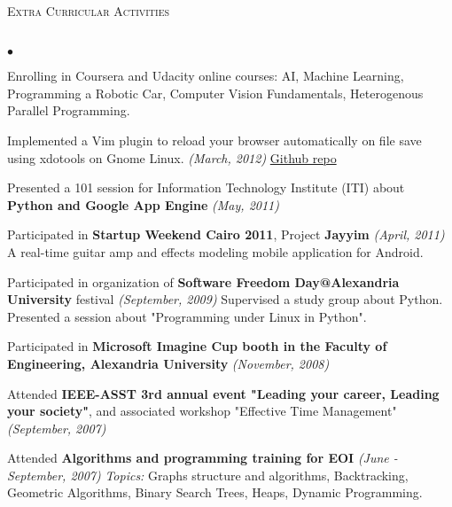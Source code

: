 \documentclass[letterpaper,12pt]{article}
\newcommand{\lineunder}{\vspace*{-8pt} \\ \hspace*{-8pt} \hrulefill \\}
\newcommand{\interval}[1]{\textit{(#1)} }
\newcommand{\header}[1]{{\hspace*{0pt}\vspace*{6pt} \textsc{#1}} \vspace*{-6pt} \lineunder}
\newenvironment{achievements}{\begin{list}{$\bullet$}{\topsep 0pt \itemsep -2pt}}{\vspace*{4pt}\end{list}}
\begin{document}
\header{Extra Curricular Activities}
\begin{achievements}
\item Enrolling in Coursera and Udacity online courses: AI, Machine Learning, Programming a Robotic Car, Computer Vision Fundamentals, Heterogenous Parallel Programming.
\item Implemented a Vim plugin to reload your browser automatically on file save using xdotools on Gnome Linux. \interval{March, 2012} \href{https://github.com/lordm/vim-browser-reload-linux}{Github repo}
\item Presented a 101 session for Information Technology Institute (ITI) about \textbf{Python and Google App Engine} \interval{May, 2011}
\item Participated in \textbf{Startup Weekend Cairo 2011}, Project \textbf{Jayyim} \interval{April, 2011}
  \subitem A real-time guitar amp and effects modeling mobile application for Android.
\item Participated in organization of \textbf{Software Freedom Day@Alexandria University} festival \interval{September, 2009}
  \subitem Supervised a study group about Python.
  \subitem Presented a session about "Programming under Linux in Python".
\item Participated in \textbf{Microsoft Imagine Cup booth in the Faculty of Engineering, Alexandria University} \interval{November, 2008}
\item Attended \textbf{IEEE-ASST 3rd annual event "Leading your career, Leading your society"}, and associated workshop "Effective Time Management" \interval{September, 2007}
\item Attended \textbf{Algorithms and programming training for EOI} \interval{June - September, 2007}
  \subitem \textit{Topics:} Graphs structure and algorithms, Backtracking, Geometric Algorithms, Binary Search Trees, Heaps, Dynamic Programming.
\end{achievements}
\end{document}
